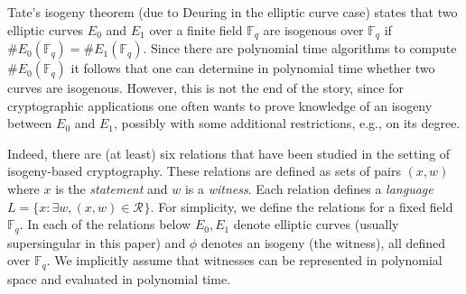 \documentclass{llncs}
\newcommand{\F}{\ensuremath{\mathbb{F}}}
\newcommand{\R}[1][]{\ensuremath{\mathcal{R}_{\mathrm{#1}}}}
\begin{document}
Tate's isogeny theorem (due to Deuring in the elliptic curve case) states that two elliptic curves $E_0$ and $E_1$ over a finite field $\F_q$ are isogenous over $\F_q$ if $\#E_0( \F_q ) = \#E_1(\F_q)$. Since there are polynomial time algorithms to compute $\#E_0( \F_q )$ it follows that one can determine in polynomial time whether two curves are isogenous. However, this is not the end of the story, since for cryptographic applications one often wants to prove knowledge of an isogeny between $E_0$ and $E_1$, possibly with some additional restrictions, e.g., on its degree.

Indeed, there are (at least) six relations that have been studied in the setting of isogeny-based cryptography.
These relations are defined as sets of pairs $(x,w)$ where $x$ is the \emph{statement} and $w$ is a \emph{witness}.
Each relation defines a \emph{language} $L = \{ x : \exists w, (x,w) \in \R \}$.
For simplicity, we define the relations for a fixed field $\F_q$.
In each of the relations below $E_0,E_1$ denote elliptic curves (usually supersingular in this paper) and $\phi$ denotes an isogeny (the witness), all defined over $\F_q$.
We implicitly assume that witnesses can be represented in polynomial space and evaluated in polynomial time.
\end{document}
